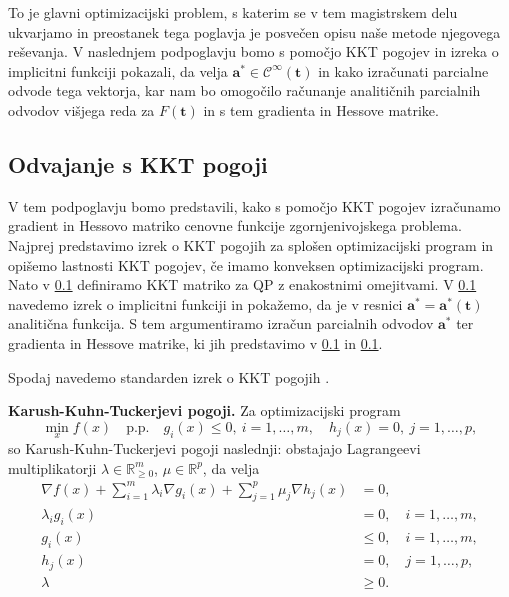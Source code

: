 \documentclass[mat2, tisk]{fmfdelo}
\begin{document}
To je glavni optimizacijski problem, s katerim se v tem magistrskem delu ukvarjamo in preostanek tega poglavja je posvečen opisu naše metode njegovega reševanja. V naslednjem podpoglavju bomo s pomočjo KKT pogojev in izreka o implicitni funkciji pokazali, da velja $\mathbf{a}^* \in \mathcal{C}^\infty(\mathbf{t})$ in kako izračunati parcialne odvode tega vektorja, kar nam bo omogočilo računanje analitičnih parcialnih odvodov višjega reda za $F(\mathbf{t})$ in s tem gradienta in Hessove matrike.


\subsection{Odvajanje s KKT pogoji}

V tem podpoglavju bomo predstavili, kako s pomočjo KKT pogojev izračunamo gradient in Hessovo matriko cenovne funkcije zgornjenivojskega problema. Najprej predstavimo izrek o KKT pogojih za splošen optimizacijski program in opišemo lastnosti KKT pogojev, če imamo konveksen optimizacijski program. Nato v \ref{} definiramo KKT matriko za QP z enakostnimi omejitvami. V \ref{} navedemo izrek o implicitni funkciji in pokažemo, da je v resnici $\mathbf{a^*} = \mathbf{a^*}(\mathbf{t})$ analitična funkcija. S tem argumentiramo izračun parcialnih odvodov $\mathbf{a^*}$ ter gradienta in Hessove matrike, ki jih predstavimo v \ref{} in \ref{}.

Spodaj navedemo standarden izrek o KKT pogojih \cite{bertsekas1997nonlinear}.

\textbf{Karush-Kuhn-Tuckerjevi pogoji.} Za optimizacijski program
\[
\min_x f(x) \quad \text{p.p.} \quad g_i(x) \leq 0, \ i=1,\dots,m, \quad h_j(x) = 0, \ j=1,\dots,p,
\]
so Karush-Kuhn-Tuckerjevi pogoji naslednji: obstajajo Lagrangeevi multiplikatorji $\lambda \in \mathbb{R}^m_{\geq 0}$, $\mu \in \mathbb{R}^p$, da velja
\begin{align}
\nabla f(x) + \sum_{i=1}^m \lambda_i \nabla g_i(x) + \sum_{j=1}^p \mu_j \nabla h_j(x) &= 0, \label{eq:kkt-stationarity} \\
\lambda_i g_i(x) &= 0, \quad i=1,\dots,m, \label{eq:kkt-complementarity} \\
g_i(x) &\leq 0, \quad i=1,\dots,m, \label{eq:kkt-primal-feasibility} \\
h_j(x) &= 0, \quad j=1,\dots,p, \label{eq:kkt-equality} \\
\lambda &\geq 0. \label{eq:kkt-dual-feasibility}
\end{align}
\end{document}
